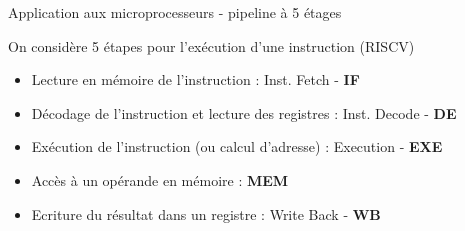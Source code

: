 %
\begin{Frame}{Application aux microprocesseurs - pipeline à 5 étages}

  \begin{block}{On considère 5 étapes pour l'exécution d'une instruction (RISCV)}
    \begin{center}
      \begin{itemize}
      \item Lecture en mémoire de l'instruction : Inst. Fetch - \textbf{IF}
      \item Décodage de l'instruction et lecture des registres : Inst. Decode - \textbf{DE}
      \item Exécution de l'instruction (ou calcul d'adresse) : Execution - \textbf{EXE}
      \item Accès à un opérande en mémoire : \textbf{MEM}
      \item Ecriture du résultat dans un registre : Write Back - \textbf{WB}
      \end{itemize}
    \end{center}
  \end{block}   
  
  \begin{center}
  \end{center}
\end{Frame}


